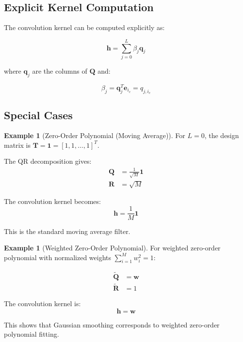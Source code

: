 \documentclass[12pt]{article}
\renewcommand{\vec}[1]{\mathbf{#1}}
\newcommand{\mat}[1]{\mathbf{#1}}
\theoremstyle{definition}
\newtheorem{example}[theorem]{Example}
\begin{document}
\subsection{Explicit Kernel Computation}
\label{subsec:explicit_kernel}

The convolution kernel can be computed explicitly as:

\begin{equation}
    \label{eq:explicit_kernel}
    \vec{h} = \sum_{j=0}^{L} \beta_j \vec{q}_j
\end{equation}

where $\vec{q}_j$ are the columns of $\mat{Q}$ and:

\begin{equation}
    \label{eq:kernel_coefficients}
    \beta_j = \vec{q}_j^T \vec{e}_{i_c} = q_{j,i_c}
\end{equation}

\subsection{Special Cases}
\label{subsec:special_cases}

\begin{example}[Zero-Order Polynomial (Moving Average)]
    \label{ex:zero_order}
    For $L = 0$, the design matrix is $\mat{T} = \vec{1} = [1, 1, \ldots, 1]^T$.

    The QR decomposition gives:
    \begin{align}
        \mat{Q} & = \frac{1}{\sqrt{M}} \vec{1} \\
        \mat{R} & = \sqrt{M}
    \end{align}

    The convolution kernel becomes:
    \begin{equation}
        \vec{h} = \frac{1}{M} \vec{1}
    \end{equation}

    This is the standard moving average filter.
\end{example}

\begin{example}[Weighted Zero-Order Polynomial]
    \label{ex:weighted_zero_order}
    For weighted zero-order polynomial with normalized weights $\sum_{i=1}^{M} w_i^2 = 1$:

    \begin{align}
        \tilde{\mat{Q}} & = \vec{w} \\
        \tilde{\mat{R}} & = 1
    \end{align}

    The convolution kernel is:
    \begin{equation}
        \vec{h} = \vec{w}
    \end{equation}

    This shows that Gaussian smoothing corresponds to weighted zero-order polynomial fitting.
\end{example}
\end{document}

